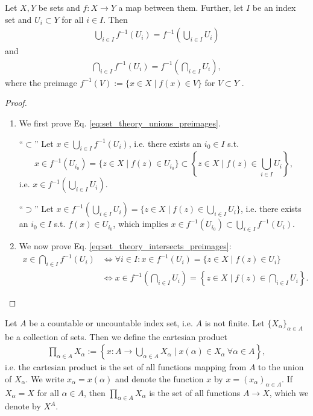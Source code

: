\begin{theorem}\label{thrm:set_theory_unions_intersects_preimages}
	Let $X, Y$ be sets and $f: X\to Y$ a map between them. Further, let $I$ be an index set and $U_i\subset Y$ for all $i\in I$. Then
	\begin{align}\label{eq:set_theory_unions_preimages}
		\bigcup_{i\in I}f^{-1}(U_i) = f^{-1}\left(\bigcup_{i\in I}U_i\right)
	\end{align}
	and
	\begin{align}\label{eq:set_theory_intersects_preimages}
		\bigcap_{i\in I}f^{-1}(U_i) = f^{-1}\left(\bigcap_{i\in I}U_i\right),
	\end{align}
	where the preimage $f^{-1}(V) := \{x\in X\mid f(x)\in V\}$ for $V\subset Y$ \cite{141357,2190480}.
\end{theorem}

\begin{proof}
	\begin{enumerate}
		\item We first prove Eq. \eqref{eq:set_theory_unions_preimages}. 		
		
		\enquote{$\subset$} Let $x\in \bigcup_{i\in I}f^{-1}(U_i)$, i.e. there exists an $i_0\in I$ s.t. $$x\in f^{-1}(U_{i_0}) = \{z\in X\mid f(z)\in U_{i_0}\} \subset \left\{ z\in X\mid f(z)\in \bigcup_{i\in I}U_i \right\},$$
		i.e. $x\in f^{-1}\left(\bigcup_{i\in I}U_i\right)$.
		
		\enquote{$\supset$} Let $x\in f^{-1}(\bigcup_{i\in I}U_i) = \{z\in X \mid f(z)\in \bigcup_{i\in I}U_i\}$, i.e. there exists an $i_0\in I$ s.t. $f(x)\in U_{i_0}$, which implies $x\in f^{-1}(U_{i_0}) \subset \bigcup_{i\in I}f^{-1}(U_i)$.
		
		\item We now prove Eq. \eqref{eq:set_theory_intersects_preimages}:
		\begin{align*}
			x\in \bigcap_{i\in I}f^{-1}(U_i) &\Leftrightarrow \forall i\in I: x\in f^{-1}(U_i) = \{z\in X\mid f(z)\in U_i\}
			\\ &\Leftrightarrow x\in f^{-1}\left(\bigcap_{i\in I}U_i\right) = \left\{z\in X\mid f(z)\in \bigcap_{i\in I}U_i\right\}.
		\end{align*}
	\end{enumerate}
\end{proof}

\begin{defn}\label{defn:infinite_cartesian_prods}
	Let $A$ be a countable or uncountable index set, i.e. $A$ is not finite. Let $\{X_{\alpha}\}_{\alpha\in A}$ be a collection of sets. Then we define the cartesian product
	\begin{align}
		\prod_{\alpha\in A}X_{\alpha} := \left\{x: A\to\bigcup_{\alpha\in A}X_{\alpha} \mid x(\alpha)\in X_{\alpha} \ \forall \alpha\in A\right\},
	\end{align}
	i.e. the cartesian product is the set of all functions mapping from $A$ to the union of $X_{\alpha}$. We write $x_{\alpha} = x(\alpha)$ and denote the function $x$ by $x = (x_{\alpha})_{\alpha\in A}$. If $X_{\alpha} = X$ for all $\alpha\in A$, then $\prod_{\alpha\in A}X_{\alpha}$ is the set of all functions $A\to X$, which we denote by $X^{A}$.
\end{defn}

